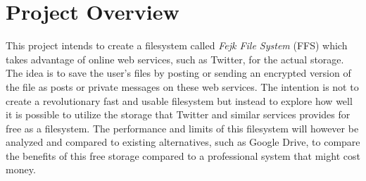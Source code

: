 \section{Project Overview}

This project intends to create a filesystem called \textit{Fejk File System} (FFS) which takes advantage of online web services, such as Twitter, for the actual storage. The idea is to save the user's files by posting or sending an encrypted version of the file as posts or private messages on these web services. The intention is not to create a revolutionary fast and usable filesystem but instead to explore how well it is possible to utilize the storage that Twitter and similar services provides for free as a filesystem. The performance and limits of this filesystem will however be analyzed and compared to existing alternatives, such as Google Drive, to compare the benefits of this free storage compared to a professional system that might cost money.